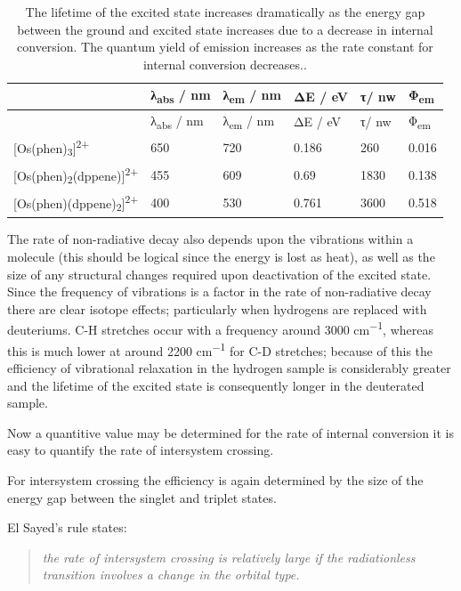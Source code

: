 \documentclass[
]{book}
\begin{document}
\begin{longtable}[]{@{}llllll@{}}
\caption{\label{tab:actinometer} The lifetime of the excited state increases dramatically as the energy gap between the ground and excited state increases due to a decrease in internal conversion. The quantum yield of emission increases as the rate constant for internal conversion decreases..}\tabularnewline
\toprule()
& λ\textsubscript{abs} / nm & λ\textsubscript{em} / nm & ΔE / eV & τ/ nw & Φ\textsubscript{em} \\
\midrule()
\endfirsthead
\toprule()
& λ\textsubscript{abs} / nm & λ\textsubscript{em} / nm & ΔE / eV & τ/ nw & Φ\textsubscript{em} \\
\midrule()
\endhead
{[}Os(phen)\textsubscript{3}{]}\textsuperscript{2+} & 650 & 720 & 0.186 & 260 & 0.016 \\
{[}Os(phen)\textsubscript{2}(dppene){]}\textsuperscript{2+} & 455 & 609 & 0.69 & 1830 & 0.138 \\
{[}Os(phen)(dppene)\textsubscript{2}{]}\textsuperscript{2+} & 400 & 530 & 0.761 & 3600 & 0.518 \\
\bottomrule()
\end{longtable}

The rate of non-radiative decay also depends upon the vibrations within a molecule (this should be logical since the energy is lost as heat), as well as the size of any structural changes required upon deactivation of the excited state. Since the frequency of vibrations is a factor in the rate of non-radiative decay there are clear isotope effects; particularly when hydrogens are replaced with deuteriums. C-H stretches occur with a frequency around 3000 cm\textsuperscript{−1}, whereas this is much lower at around 2200 cm\textsuperscript{−1} for C-D stretches; because of this the efficiency of vibrational relaxation in the hydrogen sample is considerably greater and the lifetime of the excited state is consequently longer in the deuterated sample.

Now a quantitive value may be determined for the rate of internal conversion it is easy to quantify the rate of intersystem crossing.

For intersystem crossing the efficiency is again determined by the size of the energy gap between the singlet and triplet states.

El Sayed's rule states:

\begin{quote}
\emph{the rate of intersystem crossing is relatively large if the radiationless transition involves a change in the orbital type.}
\end{quote}
\end{document}

